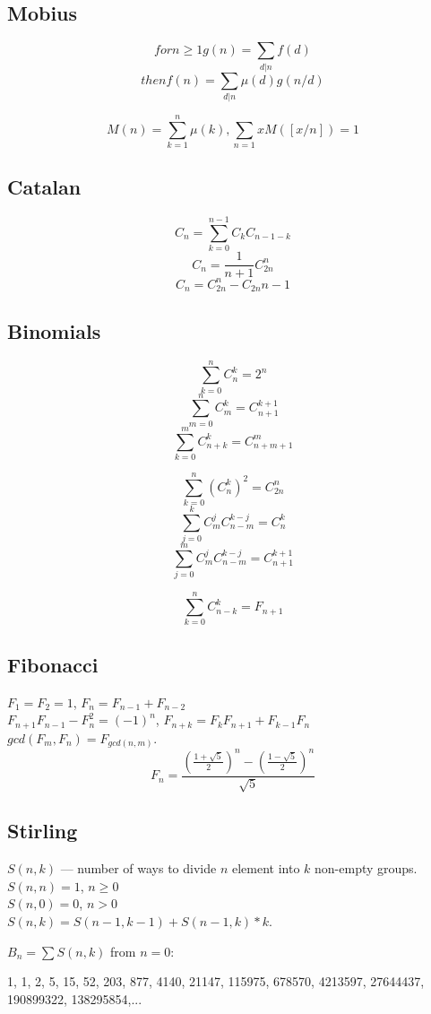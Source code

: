 \subsection{Mobius}
$$for n \ge 1 g(n) = \sum_{d|n}f(d)$$ 
$$then f(n) = \sum_{d|n}\mu(d)g(n/d)$$

$$M(n) = \sum_{k=1}^{n}\mu(k), \sum_{n = 1}{x} M([x/n]) = 1$$

\subsection{Catalan}
$$C_n = \sum_{k = 0}^{n - 1} C_kC_{n - 1 - k}$$ 
$$C_n = \frac{1}{n + 1} C_{2n}^{n}$$
$$C_n = C_{2n}^{n} - C_{2n}{n - 1}$$

\subsection{Binomials}
$$\sum_{k = 0}^{n} C_n^k = 2^n$$ 
$$\sum_{m = 0}^{n} C_m^k = C_{n + 1}^{k + 1}$$
$$\sum_{k = 0}^{m} C_{n + k}^k = C_{n + m + 1}^m$$

$$\sum_{k = 0}^{n} (C_n^k)^2 = C_{2n}^n$$
$$\sum_{j = 0}^{k} C_m^j C_{n-m}^{k - j} = C_n^k$$
$$\sum_{j = 0}^{m} C_m^j C_{n-m}^{k - j} = C_{n + 1}^{k + 1}$$

$$\sum_{k = 0}^{n} C_{n - k}^k = F_{n + 1}$$

\subsection{Fibonacci}
$F_1 = F_2 = 1$, $F_n = F_{n - 1} + F_{n - 2}$\\

$F_{n + 1} F_{n - 1} - F_n^2 = (-1)^n$,
$F_{n + k} = F_k F_{n + 1} + F_{k - 1} F_n$\\
$gcd(F_m, F_n) = F_{gcd(n, m)}$.
$$F_n = \frac{(\frac{1 + \sqrt{5}}{2})^n - (\frac{1 - \sqrt{5}}{2})^n}{\sqrt{5}}$$

\subsection{Stirling}

$S(n, k)$ --- number of ways to divide $n$ element into $k$ non-empty groups.\\

$S(n, n) = 1$, $n \ge 0$\\
$S(n, 0) = 0$, $n > 0$\\

$S(n, k) = S(n - 1, k - 1) + S(n - 1, k) * k$.


$B_n = \sum S(n, k)$ from $n = 0$:

1, 1, 2, 5, 15, 52, 203, 877, 4140, 21147, 115975, 678570, 4213597, 27644437, 190899322, 138295854,...






\
